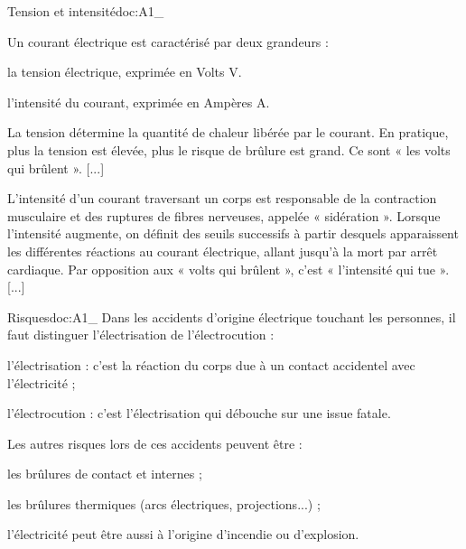 \begin{doc}{Tension et intensité}{doc:A1_}
  \begin{encart}
    Un courant électrique est caractérisé par deux grandeurs : 
    \begin{listePoints}
      \item la tension électrique, exprimée en Volts \unit{\volt}.
      \item l'intensité du courant, exprimée en Ampères \unit{\ampere}.
    \end{listePoints}
  \end{encart}
  
  La tension détermine la quantité de chaleur libérée par le courant.
  En pratique, plus la tension est élevée, plus le risque de brûlure est grand.
  Ce sont « les volts qui brûlent ». [...]
  
  L'intensité d'un courant traversant un corps est responsable de la contraction musculaire et des ruptures de fibres nerveuses, appelée « sidération ».
  Lorsque l'intensité augmente, on définit des seuils successifs à partir desquels apparaissent les différentes réactions au courant électrique, allant jusqu'à la mort par arrêt cardiaque.
  Par opposition aux « volts qui brûlent », c'est « l'intensité qui tue ». [...]
\end{doc}

\begin{doc}{Risques}{doc:A1_}
  Dans les accidents d’origine électrique touchant les personnes, il faut distinguer l’électrisation de l’électrocution :
  \begin{listePoints}      
    \item l’électrisation : c’est la réaction du corps due à un contact accidentel avec l’électricité ;
    \item l’électrocution : c’est l’électrisation qui débouche sur une issue fatale.
  \end{listePoints}
  
  Les autres risques lors de ces accidents peuvent être :
  \begin{listePoints}
    \item les brûlures de contact et internes ;
    \item les brûlures thermiques (arcs électriques, projections...) ;
    \item l’électricité peut être aussi à l’origine d’incendie ou d’explosion.
  \end{listePoints}
\end{doc}

